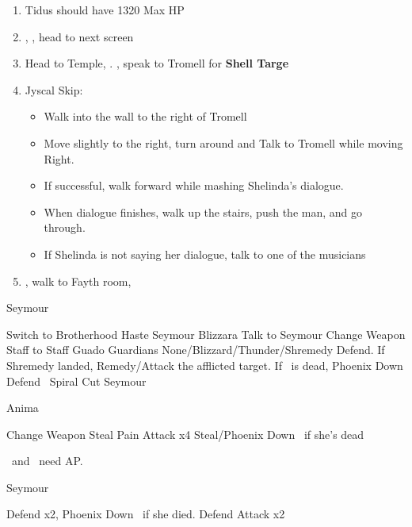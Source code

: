 \begin{enumerate}[resume]
  \item Tidus should have 1320 Max HP
  \item \sd, \cs[0:40], head to next screen
  \item Head to Temple, \sd. \save, speak to Tromell for \textbf{Shell Targe}
  \item Jyscal Skip:
        \begin{itemize}
          \item Walk into the wall to the right of Tromell
          \item Move slightly to the right, turn around and Talk to Tromell while moving Right.
          \item If successful, walk forward while mashing Shelinda's dialogue.
          \item When dialogue finishes, walk up the stairs, push the man, and go through.
          \item If Shelinda is not saying her dialogue, talk to one of the musicians
        \end{itemize}
  \item \sd, walk to Fayth room, \cs[2:10]
\end{enumerate}
\begin{battle}[3000]{Seymour}
  \begin{itemize}
    \tidusf Switch to Brotherhood
    \tidusf Haste \tidus
    \enemyf Seymour Blizzara
    \tidusf Talk to Seymour
    \yunaf Change Weapon Staff to Staff
    \enemyf Guado Guardians None/Blizzard/Thunder/Shremedy
    \kimahrif Defend. If Shremedy landed, Remedy/Attack the afflicted target. If \yuna\ is dead, Phoenix Down
    \switch{\yuna}{\auron}
    \auronf Defend
    \tidusf \od\ Spiral Cut Seymour
  \end{itemize}
\end{battle}
\begin{battle}[18000]{Anima}
\begin{itemize}
    \switch{\tidus}{\wakka}
    \wakkaf Change Weapon
            \kimahrif Steal
          \enemyf Pain
          \tidusf Attack x4
          \rikkuf Steal/Phoenix Down \yuna\ if she's dead
\end{itemize}
 \tidus\ and \yuna\ need AP.
\end{battle}
\begin{battle}[6000]{Seymour}
  \begin{itemize}
    \tidusf Defend x2, Phoenix Down \rikku\ if she died.
    \rikkuf Defend
    \tidusf Attack x2
    \end{itemize}
\end{battle}

